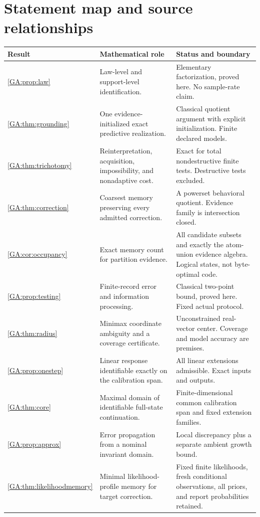 \documentclass[11pt,oneside,openany]{book}
\numberwithin{equation}{section}
\begin{document}
\section{Statement map and source relationships}\label{GA:app:claims}
\begin{small}\begin{longtable}{@{}P{.13\linewidth}P{.44\linewidth}P{.35\linewidth}@{}}\toprule
Result & Mathematical role & Status and boundary\\\midrule\endhead
\ref{GA:prop:law} & Law-level and support-level identification. & Elementary factorization, proved here. No sample-rate claim.\\
\ref{GA:thm:grounding} & One evidence-initialized exact predictive realization. & Classical quotient argument with explicit initialization. Finite declared models.\\
\ref{GA:thm:trichotomy} & Reinterpretation, acquisition, impossibility, and nonadaptive cost. & Exact for total nondestructive finite tests. Destructive tests excluded.\\
\ref{GA:thm:correction} & Coarsest memory preserving every admitted correction. & A powerset behavioral quotient. Evidence family is intersection closed.\\
\ref{GA:cor:occupancy} & Exact memory count for partition evidence. & All candidate subsets and exactly the atom-union evidence algebra. Logical states, not byte-optimal code.\\
\ref{GA:prop:testing} & Finite-record error and information processing. & Classical two-point bound, proved here. Fixed actual protocol.\\
\ref{GA:thm:radius} & Minimax coordinate ambiguity and a coverage certificate. & Unconstrained real-vector center. Coverage and model accuracy are premises.\\
\ref{GA:prop:onestep} & Linear response identifiable exactly on the calibration span. & All linear extensions admissible. Exact inputs and outputs.\\
\ref{GA:thm:core} & Maximal domain of identifiable full-state continuation. & Finite-dimensional common calibration span and fixed extension families.\\
\ref{GA:prop:approx} & Error propagation from a nominal invariant domain. & Local discrepancy plus a separate ambient growth bound.\\
\ref{GA:thm:likelihoodmemory} & Minimal likelihood-profile memory for target correction. & Fixed finite likelihoods, fresh conditional observations, all priors, and report probabilities retained.\\

\end{longtable}
\end{small}
\end{document}
